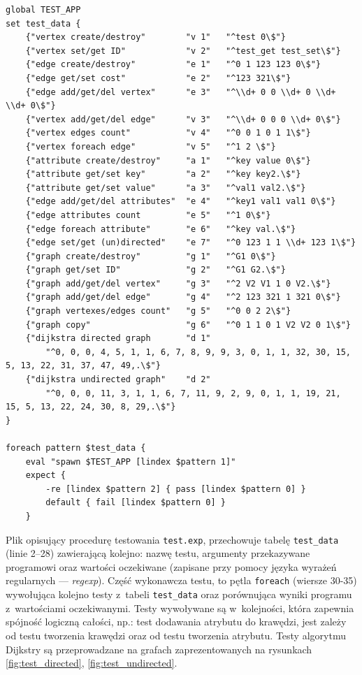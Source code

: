 \documentclass[a4paper,12pt,polish,oneside,openright]{thesis}
\newcommand\code[1]{\lstinline[style=line]{#1}}
\begin{document}
\begin{lstlisting}[style=code,caption=Plik definicji testów jednostkowych platformy DejaGNU]
global TEST_APP
set test_data {
	{"vertex create/destroy"        "v 1"   "^test 0\$"}
	{"vertex set/get ID"            "v 2"   "^test_get test_set\$"}
	{"edge create/destroy"          "e 1"   "^0 1 123 123 0\$"}
	{"edge get/set cost"            "e 2"   "^123 321\$"}
	{"edge add/get/del vertex"      "e 3"   "^\\d+ 0 0 \\d+ 0 \\d+ \\d+ 0\$"}
	{"vertex add/get/del edge"      "v 3"   "^\\d+ 0 0 0 \\d+ 0\$"}
	{"vertex edges count"           "v 4"   "^0 0 1 0 1 1\$"}
	{"vertex foreach edge"          "v 5"   "^1 2 \$"}
	{"attribute create/destroy"     "a 1"   "^key value 0\$"}
	{"attribute get/set key"        "a 2"   "^key key2.\$"}
	{"attribute get/set value"      "a 3"   "^val1 val2.\$"}
	{"edge add/get/del attributes"  "e 4"   "^key1 val1 val1 0\$"}
	{"edge attributes count         "e 5"   "^1 0\$"}
	{"edge foreach attribute"       "e 6"   "^key val.\$"}
	{"edge set/get (un)directed"    "e 7"   "^0 123 1 1 \\d+ 123 1\$"}
	{"graph create/destroy"         "g 1"   "^G1 0\$"}
	{"graph get/set ID"             "g 2"   "^G1 G2.\$"}
	{"graph add/get/del vertex"     "g 3"   "^2 V2 V1 1 0 V2.\$"}
	{"graph add/get/del edge"       "g 4"   "^2 123 321 1 321 0\$"}
	{"graph vertexes/edges count"   "g 5"   "^0 0 2 2\$"}
	{"graph copy"                   "g 6"   "^0 1 1 0 1 V2 V2 0 1\$"}
	{"dijkstra directed graph       "d 1"
		"^0, 0, 0, 4, 5, 1, 1, 6, 7, 8, 9, 9, 3, 0, 1, 1, 32, 30, 15, 5, 13, 22, 31, 37, 47, 49,.\$"}
	{"dijkstra undirected graph"    "d 2"
		"^0, 0, 0, 11, 3, 1, 1, 6, 7, 11, 9, 2, 9, 0, 1, 1, 19, 21, 15, 5, 13, 22, 24, 30, 8, 29,.\$"}
}

foreach pattern $test_data {
	eval "spawn $TEST_APP [lindex $pattern 1]"
	expect {
		-re [lindex $pattern 2] { pass [lindex $pattern 0] }
		default { fail [lindex $pattern 0] }
	}
\end{lstlisting}
Plik opisujący procedurę testowania \code{test.exp}, przechowuje tabelę \code{test_data} (linie 2--28) zawierającą kolejno: nazwę testu, argumenty przekazywane programowi oraz wartości oczekiwane (zapisane przy pomocy języka wyrażeń regularnych --- \emph{regexp}).
Część wykonawcza testu, to pętla \code{foreach} (wiersze 30-35) wywołująca kolejno testy z~tabeli \code{test_data} oraz porównująca wyniki programu z~wartościami oczekiwanymi.
Testy wywoływane są w~kolejności, która zapewnia spójność logiczną całości, np.: test dodawania atrybutu do krawędzi, jest zależy od testu tworzenia krawędzi oraz od testu tworzenia atrybutu.
Testy algorytmu Dijkstry są przeprowadzane na grafach zaprezentowanych na rysunkach \ref{fig:test_directed}, \ref{fig:test_undirected}.
\end{document}

